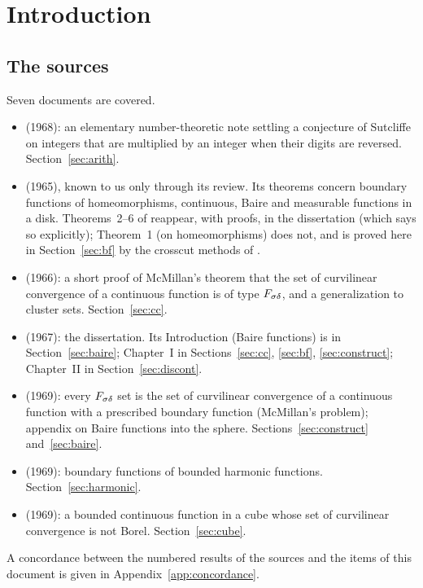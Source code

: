 \section{Introduction}\label{sec:intro}

\subsection{The sources}
Seven documents are covered.
\begin{itemize}[leftmargin=2em]
\item \cite{MathMag} (1968): an elementary number-theoretic note settling a conjecture of Sutcliffe
  on integers that are multiplied by an integer when their digits are reversed. Section~\ref{sec:arith}.
\item \cite{JMM} (1965), known to us only through its review. Its theorems concern boundary functions of
  homeomorphisms, continuous, Baire and measurable functions in a disk. Theorems~2--6 of \cite{JMM}
  reappear, with proofs, in the dissertation \cite{Diss} (which says so explicitly); Theorem~1 (on
  homeomorphisms) does not, and is proved here in Section~\ref{sec:bf} by the crosscut methods of
  \cite{MMJ,Diss}.
\item \cite{MMJ} (1966): a short proof of McMillan's theorem that the set of curvilinear convergence of
  a continuous function is of type $F_{\sigma\delta}$, and a generalization to cluster sets. Section~\ref{sec:cc}.
\item \cite{Diss} (1967): the dissertation. Its Introduction (Baire functions) is in
  Section~\ref{sec:baire}; Chapter~I in Sections~\ref{sec:cc}, \ref{sec:bf}, \ref{sec:construct};
  Chapter~II in Section~\ref{sec:discont}.
\item \cite{TAMSb} (1969): every $F_{\sigma\delta}$ set is the set of curvilinear convergence of a continuous
  function with a prescribed boundary function (McMillan's problem); appendix on Baire functions into
  the sphere. Sections~\ref{sec:construct} and~\ref{sec:baire}.
\item \cite{TAMSa} (1969): boundary functions of bounded harmonic functions. Section~\ref{sec:harmonic}.
\item \cite{PAMS} (1969): a bounded continuous function in a cube whose set of curvilinear
  convergence is not Borel. Section~\ref{sec:cube}.
\end{itemize}
A concordance between the numbered results of the sources and the items of this document is given in
Appendix~\ref{app:concordance}.

